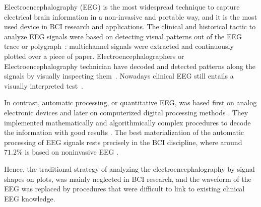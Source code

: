 


Electroencephalography (EEG) is the most widespread technique to capture electrical brain information in a non-invasive and portable way, and it is the most used device in BCI research and applications.  The clinical and historical tactic to analyze EEG signals were based on detecting visual patterns out of the EEG trace or polygraph~\cite{Hartman2005}: multichannel signals were extracted and continuously plotted over a piece of paper. Electroencephalographers or Electroencephalography technician have decoded and detected patterns along the signals by visually inspecting them~\cite{Schomer2010}.   Nowadays clinical EEG still entails a visually interpreted test~\cite{Hartman2005}.

In contrast, automatic processing, or quantitative EEG, was based first on analog electronic devices and later on computerized digital processing methods \cite{Jansen1991}.  They implemented mathematically and algorithmically complex procedures to decode the information with good results \cite{Yuste2017}.  The best materialization of the automatic processing of EEG signals rests precisely in the BCI discipline, where around $71.2\%$ is based on noninvasive EEG \cite{Guger2017}.  


Hence, the traditional strategy of analyzing the electroencephalography by signal shapes on plots, was mainly neglected in BCI research, and the waveform of the EEG was replaced by procedures that were difficult to link to existing clinical EEG knowledge.  


